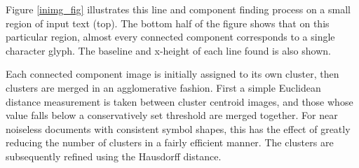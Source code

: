 \documentclass[times, 10pt,twocolumn]{article}
\begin{document}
Figure \ref{inimg_fig} illustrates this line and component finding process on a
small region of input text (top).  The bottom half of the figure shows that on
this particular region, almost every connected component corresponds to a
single character glyph.  The baseline and x-height of each line found is also
shown.

Each connected component image is initially assigned to its own cluster, then
clusters are merged in an agglomerative fashion.  First a simple Euclidean
distance measurement is taken between cluster centroid images, and those whose
value falls below a conservatively set threshold are merged together.  For near
noiseless documents with consistent symbol shapes, this has the effect of 
greatly reducing the number of clusters in a fairly efficient manner.
%
%
%
The clusters are subsequently refined using the
Hausdorff distance\cite{rucklidge1996}.  
%
\end{document}
